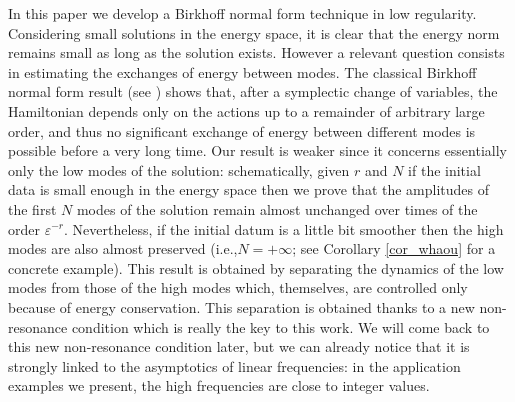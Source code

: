 \documentclass[11pt]{article}
\newcommand{\ie}{i.e.,\xspace}
\theoremstyle{definition}
\begin{document}
In this paper we develop a Birkhoff normal form technique in low regularity. Considering small solutions in the energy space, it is clear that the energy norm remains small as long as the solution exists. However a relevant question consists in estimating the exchanges of energy between modes. The classical Birkhoff normal form result (see \cite{Nek77,G}) shows that, after a symplectic change of variables, the Hamiltonian depends only on the actions up to a remainder of arbitrary large order, and thus no significant exchange of energy between different modes is possible before a very long time. Our result is weaker since
it concerns essentially only the low modes of the solution: schematically, given $r$ and $N$ if the initial data is small enough in the energy space then we prove that the amplitudes of the first $N$ modes of the solution remain almost unchanged over times of the order $\varepsilon^{-r}$. Nevertheless, if the initial datum is a little bit smoother then the high modes are also almost preserved (\ie $N=+\infty$; see Corollary \ref{cor_whaou} for a concrete example). This result is obtained by separating the dynamics of the low modes from those of the high modes which, themselves, are controlled only because of energy conservation. This separation is obtained thanks to a new non-resonance condition which is really the key to this work. We will come back to this new non-resonance condition later, but we can already notice that it is strongly linked to the asymptotics of linear frequencies: in the application examples we present, the high frequencies are close to integer values.
\end{document}
